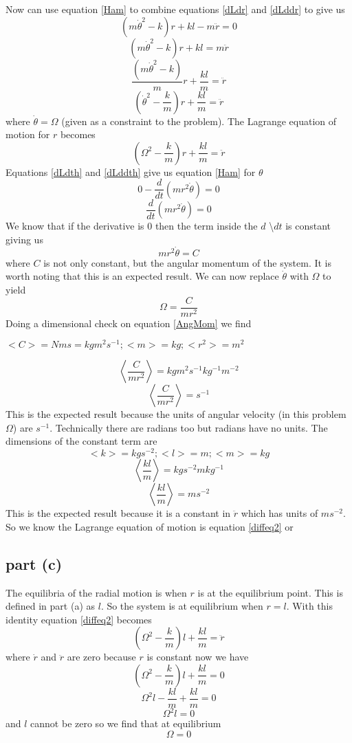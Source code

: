 \documentclass[11pt]{article}
\numberwithin{equation}{section}
\begin{document}
Now can use equation \ref{Ham} to combine equations \ref{dLdr} and \ref{dLddr} to give us
$$(m\dot{\theta}^2 - k)r +kl - m\ddot{r} = 0$$
$$(m\dot{\theta}^2 - k)r + kl = m\ddot{r}$$
$$\frac{(m\dot{\theta}^2 - k)}{m}r +\frac{kl}{m}= \ddot{r}$$
$$(\dot{\theta}^2 - \frac{k}{m})r + \frac{kl}{m}= \ddot{r}$$
where $\dot{\theta} = \Omega$ (given as a constraint to the problem). The Lagrange equation of motion for $r$ becomes
\begin{equation}
(\Omega^2 - \frac{k}{m})r + \frac{kl}{m}= \ddot{r}
\label{diffeq2}
\end{equation}
Equations \ref{dLdth} and \ref{dLddth} give us equation \ref{Ham} for $\theta$
$$0 - \frac{d}{dt}\left(mr^2\dot{\theta}\right) = 0$$
$$\frac{d}{dt}\left(mr^2\dot{\theta}\right) = 0$$
We know that if the derivative is 0 then the term inside the $d$ \textbackslash $dt$ is constant giving us
$$mr^2\dot{\theta} = C$$
where $C$ is not only constant, but the angular momentum of the system. It is worth noting that this is an expected result. We can now replace $\dot{\theta}$ with $\Omega$ to yield
\begin{equation}
\Omega = \frac{C}{mr^2}
\label{AngMom}
\end{equation}
Doing a dimensional check on equation \ref{AngMom} we find
\begin{center}
$<C> = Nms = kg m^2 s^{-1}; <m> = kg; <r^2> = m^2$
\end{center}
$$\left<\frac{C}{mr^2}\right> = kg m^2 s^{-1} kg^{-1} m^{-2}$$
$$\left<\frac{C}{mr^2}\right> = s^{-1}$$
This is the expected result because the units of angular velocity (in this problem $\Omega$) are $s^{-1}$. Technically there are radians too but radians have no units.
The dimensions of the constant term are
$$<k> = kg s^{-2}; <l> = m; <m> = kg$$
$$\left<\frac{kl}{m}\right> = kg s^{-2} m kg^{-1}$$
$$\left<\frac{kl}{m}\right> = m s^{-2}$$
This is the expected result because it is a constant in $\ddot{r}$ which has units of $m s^{-2}$. So we know the Lagrange equation of motion is equation \ref{diffeq2} or
\begin{center}
\end{center}

\subsection{part (c)}
The equilibria of the radial motion is when $r$ is at the equilibrium point. This is defined in part (a) as $l$. So the system is at equilibrium when $r=l$. With this identity equation \ref{diffeq2} becomes
$$(\Omega^2 - \frac{k}{m})l +\frac{kl}{m} = \ddot{r}$$
where $\dot{r}$ and $\ddot{r}$ are zero because $r$ is constant now we have 
$$(\Omega^2 - \frac{k}{m})l +\frac{kl}{m} = 0$$
$$\Omega^2l - \frac{kl}{m} +\frac{kl}{m} = 0$$
$$\Omega^2l = 0$$
and $l$ cannot be zero so we find that at equilibrium
\begin{equation}
\Omega = 0
\end{equation}
\end{document}
